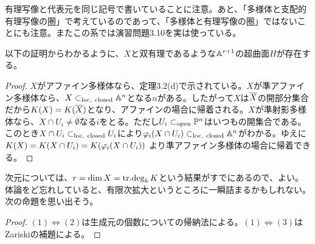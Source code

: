 \begin{rem}
有理写像と代表元を同じ記号で書いていることに注意。あと、「多様体と支配的有理写像の圏」で考えているのであって、「多様体と有理写像の圏」ではないことにも注意。またこの系では演習問題3.10を実は使っている。
\end{rem}


\begin{rem}
  以下の証明からわかるように、$X$と双有理であるような${\mathbb A}^{r+1}$の超曲面$H$が存在する。
\end{rem}



\begin{proof}
$X$がアファイン多様体なら、定理3.2(d)で示されている。$X$が準アファイン多様体なら、$X \subset_{\text{loc. closed}} {\mathbb A}^n$となる$n$がある。したがって$X$は$\overline{X}$の開部分集合だから$K(X) = K(\overline{X})$となり、アファインの場合に帰着される。$X$が準射影多様体なら、$X \cap U_i \neq \emptyset$なる$i$をとる。ただし$U_i \subset_{\text{open}} {\mathbb P}^n$はいつもの開集合である。このとき$X \cap U_i \subset_{\text{loc. closed}} U_i$により${\varphi}_i(X \cap U_i) \subset_{\text{loc. closed}} {\mathbb A}^n$がわかる。ゆえに$K(X) = K(X \cap U_i) = K({\varphi}_i(X \cap U_i))$
より準アファイン多様体の場合に帰着できる。
\end{proof}




\begin{rem}
次元については、$r = \dim X = \operatorname{tr\text{.}deg}_k K$という結果がすでにあるので、よい。
  体論をど忘れしていると、有限次拡大というところに一瞬詰まるかもしれない。次の命題を思い出そう。
\end{rem}

\begin{proof}
  $(1)\Leftrightarrow (2)$は生成元の個数についての帰納法による。$(1)\Leftrightarrow(3)$はZariskiの補題による。
\end{proof}




